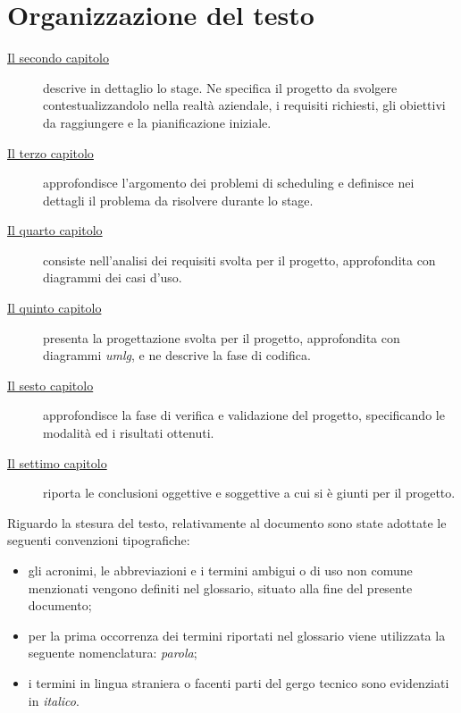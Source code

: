 \section{Organizzazione del testo}

\begin{description}
    \item[{\hyperref[cap:descrizione-stage]{Il secondo capitolo}}] descrive in dettaglio lo stage. Ne specifica il progetto da svolgere contestualizzandolo nella realtà aziendale, i requisiti richiesti, gli obiettivi da raggiungere e la pianificazione iniziale.
    
    \item[{\hyperref[cap:definizione-problema]{Il terzo capitolo}}] approfondisce l'argomento dei problemi di scheduling e definisce nei dettagli il problema da risolvere durante lo stage.
    
    \item[{\hyperref[cap:analisi-requisiti]{Il quarto capitolo}}] consiste nell'analisi dei requisiti svolta per il progetto, approfondita con diagrammi dei casi d'uso.
    
    \item[{\hyperref[cap:progettazione-codifica]{Il quinto capitolo}}] presenta la progettazione svolta per il progetto, approfondita con diagrammi \emph{\gls{umlg}}\glsfirstoccur, e ne descrive la fase di codifica.
    
    \item[{\hyperref[cap:verifica-validazione]{Il sesto capitolo}}] approfondisce la fase di verifica e validazione del progetto, specificando le modalità ed i risultati ottenuti.
    
    \item[{\hyperref[cap:conclusioni]{Il settimo capitolo}}]
    riporta le conclusioni oggettive e soggettive a cui si è giunti per il progetto.
\end{description}

\noindent
Riguardo la stesura del testo, relativamente al documento sono state adottate le seguenti convenzioni tipografiche:
\begin{itemize}
	\item gli acronimi, le abbreviazioni e i termini ambigui o di uso non comune menzionati vengono definiti nel glossario, situato alla fine del presente documento;
	\item per la prima occorrenza dei termini riportati nel glossario viene utilizzata la seguente nomenclatura: \emph{parola}\glsfirstoccur;
	\item i termini in lingua straniera o facenti parti del gergo tecnico sono evidenziati in \emph{italico}.
\end{itemize}